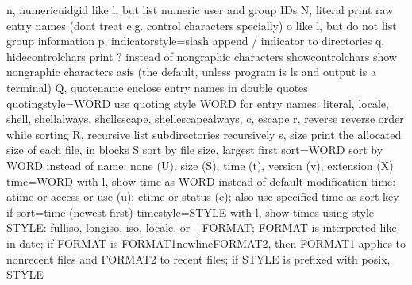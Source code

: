 \documentclass[letterpaper,12pt,english]{sphinxmanual}
\begin{document}
\begin{sphinxVerbatim}[commandchars=\\\{\}]
  \PYGZhy{}n, \PYGZhy{}\PYGZhy{}numeric\PYGZhy{}uid\PYGZhy{}gid      like \PYGZhy{}l, but list numeric user and group IDs
  \PYGZhy{}N, \PYGZhy{}\PYGZhy{}literal              print raw entry names (don\PYGZsq{}t treat e.g.   control
                               characters specially)
  \PYGZhy{}o                         like \PYGZhy{}l, but do not list group information
  \PYGZhy{}p, \PYGZhy{}\PYGZhy{}indicator\PYGZhy{}style=slash
                             append / indicator to directories
  \PYGZhy{}q, \PYGZhy{}\PYGZhy{}hide\PYGZhy{}control\PYGZhy{}chars   print ? instead of nongraphic characters
      \PYGZhy{}\PYGZhy{}show\PYGZhy{}control\PYGZhy{}chars   show nongraphic characters as\PYGZhy{}is (the   default,
                               unless program is \PYGZsq{}ls\PYGZsq{} and output is a   terminal)
  \PYGZhy{}Q, \PYGZhy{}\PYGZhy{}quote\PYGZhy{}name           enclose entry names in double quotes
      \PYGZhy{}\PYGZhy{}quoting\PYGZhy{}style=WORD   use quoting style WORD for entry names:
                               literal, locale, shell, shell\PYGZhy{}always,
                               shell\PYGZhy{}escape, shell\PYGZhy{}escape\PYGZhy{}always, c,   escape
  \PYGZhy{}r, \PYGZhy{}\PYGZhy{}reverse              reverse order while sorting
  \PYGZhy{}R, \PYGZhy{}\PYGZhy{}recursive            list subdirectories recursively
  \PYGZhy{}s, \PYGZhy{}\PYGZhy{}size                 print the allocated size of each file, in   blocks
  \PYGZhy{}S                         sort by file size, largest first
      \PYGZhy{}\PYGZhy{}sort=WORD            sort by WORD instead of name: none (\PYGZhy{}U),   size (\PYGZhy{}S),
                               time (\PYGZhy{}t), version (\PYGZhy{}v), extension (\PYGZhy{}X)
      \PYGZhy{}\PYGZhy{}time=WORD            with \PYGZhy{}l, show time as WORD instead of default
                               modification time: atime or access or use   (\PYGZhy{}u);
                               ctime or status (\PYGZhy{}c); also use specified   time
                               as sort key if \PYGZhy{}\PYGZhy{}sort=time (newest first)
      \PYGZhy{}\PYGZhy{}time\PYGZhy{}style=STYLE     with \PYGZhy{}l, show times using style STYLE:
                               full\PYGZhy{}iso, long\PYGZhy{}iso, iso, locale, or   +FORMAT;
                               FORMAT is interpreted like in \PYGZsq{}date\PYGZsq{}; if   FORMAT
                               is FORMAT1\PYGZlt{}newline\PYGZgt{}FORMAT2, then FORMAT1   applies
                               to non\PYGZhy{}recent files and FORMAT2 to recent   files;
                               if STYLE is prefixed with \PYGZsq{}posix\PYGZhy{}\PYGZsq{}, STYLE

\end{sphinxVerbatim}
\end{document}
